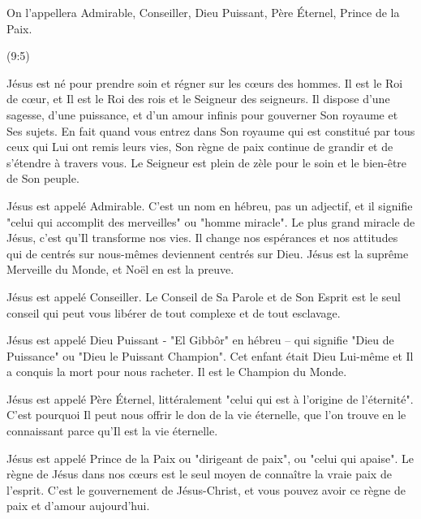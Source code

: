 
\epigraph{%
On l’appellera Admirable, Conseiller, Dieu Puissant, Père Éternel, Prince de la Paix.}{(9:5)}

Jésus est né pour prendre soin et régner sur les cœurs des hommes. Il est le Roi de cœur, et Il est le Roi des rois et le Seigneur des seigneurs. Il dispose d'une sagesse, d'une puissance, et d'un amour infinis pour gouverner Son royaume et Ses sujets. En fait quand vous entrez dans Son royaume qui est constitué par tous ceux qui Lui ont remis leurs vies, Son règne de paix continue de grandir et de s'étendre à travers vous. Le Seigneur est plein de zèle pour le soin et le bien-être de Son peuple.

Jésus est appelé Admirable. C'est un nom en hébreu, pas un adjectif, et il signifie "celui qui accomplit des merveilles" ou "homme miracle". Le plus grand miracle de Jésus, c'est qu'Il transforme nos vies. Il change nos espérances et nos attitudes qui de centrés sur nous-mêmes deviennent centrés sur Dieu. Jésus est la suprême Merveille du Monde, et Noël en est la preuve.

Jésus est appelé Conseiller. Le Conseil de Sa Parole et de Son Esprit est le seul conseil qui peut vous libérer de tout complexe et de tout esclavage.

Jésus est appelé Dieu Puissant - "El Gibbôr" en hébreu – qui signifie "Dieu de Puissance" ou "Dieu le Puissant Champion". Cet enfant était Dieu Lui-même et Il a conquis la mort pour nous racheter. Il est le Champion du Monde.

Jésus est appelé Père Éternel, littéralement "celui qui est à l'origine de l'éternité". C'est pourquoi Il peut nous offrir le don de la vie éternelle, que l'on trouve en le connaissant parce qu'Il est la vie éternelle.



Jésus est appelé Prince de la Paix ou "dirigeant de paix", ou "celui qui apaise". Le règne de Jésus dans nos cœurs est le seul moyen de connaître la vraie paix de l'esprit. C'est le gouvernement de Jésus-Christ, et vous pouvez avoir ce règne de paix et d'amour aujourd'hui.







